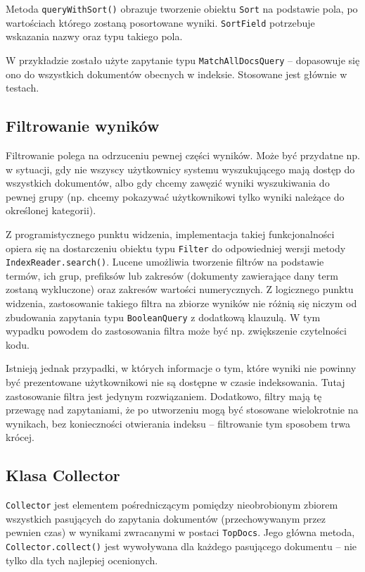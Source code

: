 Metoda \texttt{queryWithSort()} obrazuje tworzenie obiektu \texttt{Sort} na podstawie pola, po wartościach którego zostaną posortowane wyniki. \texttt{SortField} potrzebuje wskazania nazwy oraz typu takiego pola. 

W przykładzie zostało użyte zapytanie typu \texttt{MatchAllDocsQuery} -- dopasowuje się ono do wszystkich dokumentów obecnych w indeksie. Stosowane jest głównie w testach.

\subsection{Filtrowanie wyników}

Filtrowanie polega na odrzuceniu pewnej części wyników. Może być przydatne np. w sytuacji, gdy nie wszyscy użytkownicy systemu wyszukującego mają dostęp do wszystkich dokumentów, albo gdy chcemy zawęzić wyniki wyszukiwania do pewnej grupy (np. chcemy pokazywać użytkownikowi tylko wyniki należące do określonej kategorii).

Z programistycznego punktu widzenia, implementacja takiej funkcjonalności opiera się na dostarczeniu obiektu typu \texttt{Filter} do odpowiedniej wersji metody \texttt{IndexReader.search()}. Lucene umożliwia tworzenie filtrów na podstawie termów, ich grup, prefiksów lub zakresów (dokumenty zawierające dany term zostaną wykluczone) oraz zakresów wartości numerycznych. Z logicznego punktu widzenia, zastosowanie takiego filtra na zbiorze wyników nie różnią się niczym od zbudowania zapytania typu \texttt{BooleanQuery} z dodatkową klauzulą. W tym wypadku powodem do zastosowania filtra może być np. zwiększenie czytelności kodu. 

Istnieją jednak przypadki, w których informacje o tym, które wyniki nie powinny być prezentowane użytkownikowi nie są dostępne w czasie indeksowania. Tutaj zastosowanie filtra jest jedynym rozwiązaniem. Dodatkowo, filtry mają tę przewagę nad zapytaniami, że po utworzeniu mogą być stosowane wielokrotnie na wynikach, bez konieczności otwierania indeksu -- filtrowanie tym sposobem trwa krócej. 

\subsection{Klasa Collector}

\texttt{Collector} jest elementem pośredniczącym pomiędzy nieobrobionym zbiorem wszystkich pasujących do zapytania dokumentów (przechowywanym przez pewnien czas) w wynikami zwracanymi w postaci \texttt{TopDocs}. Jego główna metoda, \texttt{Collector.collect()} jest wywoływana dla każdego pasującego dokumentu -- nie tylko dla tych najlepiej ocenionych. 


